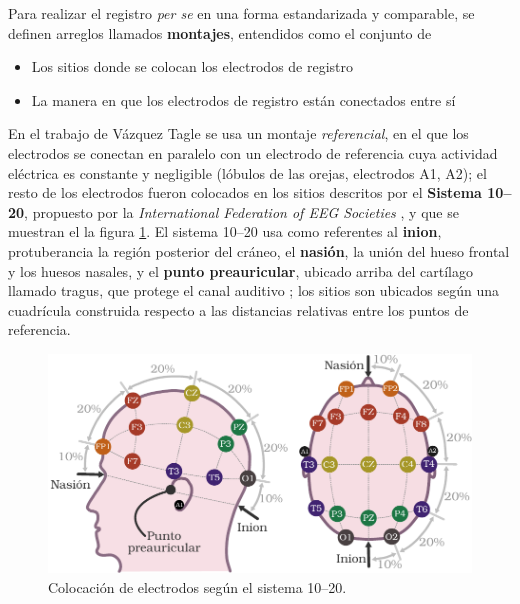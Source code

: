 Para realizar el registro \textit{per se} en una forma estandarizada y comparable, se definen
arreglos llamados \textbf{montajes}, entendidos como el conjunto de 
\begin{itemize}
\item Los sitios donde se colocan los electrodos de registro
\item La manera en que los electrodos de registro están conectados entre sí
\end{itemize}

En el trabajo de Vázquez Tagle \cite{VazquezTagle16} se usa un montaje \textit{referencial}, en el 
que los electrodos se conectan en paralelo con un electrodo de referencia cuya actividad eléctrica 
es constante y negligible (lóbulos de las orejas, electrodos A1, A2);
el resto de los electrodos fueron colocados en los sitios descritos por el \textbf{Sistema 10--20}, 
propuesto por la \textit{International Federation of EEG Societies} \cite{Jasper58,Klem99}, 
y que se muestran el la figura \ref{img1020}.
%
El sistema 10--20 usa como referentes al \textbf{inion}, protuberancia la región posterior del 
cráneo, el \textbf{nasión}, la unión del hueso frontal y los huesos nasales, y el \textbf{punto 
preauricular}, ubicado arriba del cartílago llamado tragus, que protege el canal auditivo ; los 
sitios son ubicados según una cuadrícula construida respecto a las distancias 
relativas entre los puntos de referencia.


\begin{figure}
\centering
\includegraphics[width=\linewidth]{./img_diagramas/cabeza_proporcionada_color.pdf} 
\caption{Colocación de electrodos según el sistema 10--20.
}
\label{img1020}
\end{figure}

